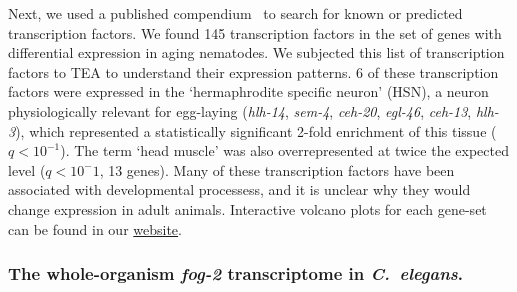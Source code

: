 \documentclass[10pt,letterpaper,twocolumn]{article}
\newcommand{\cel}{\emph{C.~elegans}}
\newcommand{\fog}{\emph{\mbox{fog-2}}}
\newcommand{\tfaging}{145}
\newcommand{\webref}{
\href{https://wormlabcaltech.github.io/Angeles_Leighton_2016/}{website}}
\newcommand{\ra}[1]{\renewcommand{\arraystretch}{#1}}
\begin{document}

Next, we used a published compendium~\cite{Reece-Hoyes2005} to search for known
or predicted transcription factors. We found \tfaging{} transcription factors in
the set of genes with differential expression in aging nematodes. We subjected
this list of transcription factors to TEA to understand their expression
patterns. 6 of these
transcription factors were expressed in the `hermaphrodite specific neuron'
(HSN), a neuron physiologically relevant for egg-laying (\emph{hlh-14}, \emph{sem-4},
\emph{ceh-20}, \emph{egl-46}, \emph{ceh-13}, \emph{hlh-3}), which represented
a statistically significant 2-fold enrichment of this tissue ($q<10^{-1}$).
The term `head muscle' was also overrepresented at twice the expected level
($q<10^-1$, 13 genes). Many of these transcription factors
have been  associated with developmental processess, and it is unclear why they
would change expression in adult animals. Interactive volcano plots for each
gene-set can be found in our \webref{}.

\subsubsection*{The whole-organism \fog{} transcriptome in \cel{}.}
\end{document}
